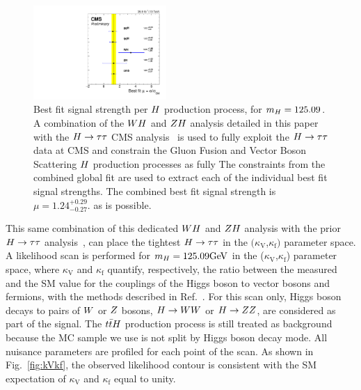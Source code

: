 \begin{figure}[!ht]
 \begin{center}
  \includegraphics[width=0.45\textwidth]{higgs_to_taus_vh/plots/combined/mu_higgs_procs.pdf}
 \end{center}
 \caption{
 Best fit signal strength per $H$ production process, for $m_{H} = 125.09$\GeV.
 A combination of the $WH$ and $ZH$ analysis detailed in this paper
 with the $H\to\tau\tau$ CMS analysis~\cite{HIG-16-043} is used to
 fully exploit the $H\to\tau\tau$ data at CMS and constrain the
 Gluon Fusion and Vector Boson Scattering $H$ production processes as fully
 The constraints from the combined global fit are used to extract each of the 
 individual best fit signal strengths. The combined best fit signal strength 
 is $\mu = 1.24 ^{+0.29} _{-0.27}$.
 as is possible.
 }
 \label{fig:mu_higgs_processes}
\end{figure}

This same combination of this dedicated $WH$ and $ZH$ analysis with the prior
$H \to \tau\tau$ analysis~\cite{HIG-16-043}, can place the tightest
$H \to \tau\tau$ in the $(\kappa_\text{V}$,$\kappa_\text{f})$ parameter space.
A likelihood scan is performed for $m_{H}=125.09\mathrm{GeV}$ in the ($\kappa_\text{V}$,$\kappa_\text{f}$) 
parameter space, where $\kappa_\text{V}$ and $\kappa_\text{f}$ quantify, respectively, 
the ratio between the measured and the SM value for the couplings of the Higgs boson to 
vector bosons and fermions, with the methods described in Ref.~\cite{Chatrchyan:2014nva}. 
For this scan only, Higgs boson decays to pairs of $W$ or $Z$ bosons, $H\to WW$ or $H\to ZZ$,
 are considered as part of 
the signal. The $t\bar{t}H$ production process is still treated as background because
the MC sample we use is not split by Higgs boson decay mode. All nuisance 
parameters are profiled for each point of the scan. As shown in 
Fig.~\ref{fig:kVkf}, the observed likelihood contour is consistent with the SM expectation 
of $\kappa_\text{V}$ and $\kappa_\text{f}$ equal to unity.

